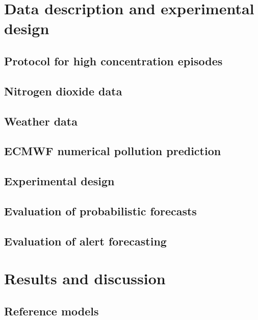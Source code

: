\documentclass[a4paper,twocolumn,5p]{elsarticle}
\begin{document}
\section{Data description and experimental design}
\label{sec:mm}

\subsection{Protocol for high \no concentration episodes}
\label{sec:madr-prot-high}


\subsection{Nitrogen dioxide data}
\label{sec:no2}


\subsection{Weather data}
\label{sec:weather-data}

\subsection{ECMWF numerical pollution prediction}
\label{sec:ecmwf-numer-poll}


\subsection{Experimental design}
\label{sec:experimental-design}

\subsection{Evaluation of probabilistic forecasts}
\label{sec:eval-prob-forec}


\subsection{Evaluation of alert forecasting}
\label{sec:eval-extr-value}


\section{Results and discussion}
\label{sec:results}


\subsection{Reference models}
\label{sec:deterministic}
\end{document}
